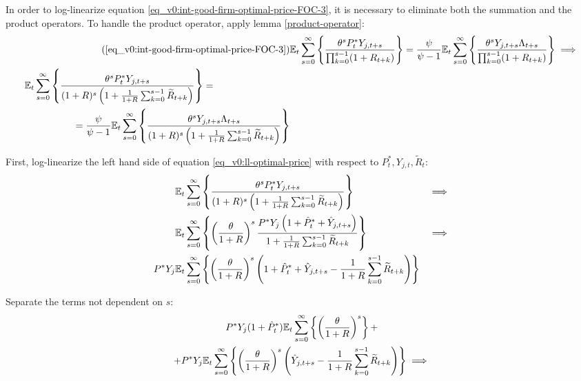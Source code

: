 \documentclass[
thesis.tex
]{subfiles}
\begin{document}
	In order to log-linearize equation \ref{eq_v0:int-good-firm-optimal-price-FOC-3}, it is necessary to eliminate both the summation and the product operators. To handle the product operator, apply lemma \ref{product-operator}:
	\begin{align}
		\tag{\ref{eq_v0:int-good-firm-optimal-price-FOC-3}}
		& \E \sum_{s=0}^{\infty} \left\{ \frac{\theta^s P_t^\ast Y_{j,t+s} }{ \prod_{k=0}^{s-1}(1+R_{t+k})} \right\} = \frac{\psi}{\psi-1} \E \sum_{s=0}^{\infty} \left\{ \frac{\theta^s Y_{j,t+s} \Lambda_{t+s}}{\prod_{k=0}^{s-1}(1+R_{t+k})} \right\} \implies
		\\
		\begin{split}
			& \E \sum_{s=0}^{\infty} \left\{ \frac{\theta^s P_t^\ast Y_{j,t+s}}{ (1 + R)^s \left( 1 + \frac{1}{1 + R} \sum_{k=0}^{s-1} \widetilde{R}_{t+k} \right) } \right\} = 
			\\ & \quad \quad \quad \quad \quad = \frac{\psi}{\psi-1} \E \sum_{s=0}^{\infty} \left\{ \frac{\theta^s Y_{j,t+s} \Lambda_{t+s}}{ (1 + R)^s \left( 1 + \frac{1}{1 + R} \sum_{k=0}^{s-1} \widetilde{R}_{t+k} \right) } \right\} \label{eq_v0:ll-optimal-price}
		\end{split}
	\end{align}
	
	First, log-linearize the left hand side of equation \ref{eq_v0:ll-optimal-price} with respect to \( P_t^\ast, Y_{j,t}, \widetilde{R}_t \):
	\begin{alignat}{2}
		& {\mathbb{E}_{t}} \sum_{s=0}^{\infty} \left\{ \frac{\theta^s P_t^\ast Y_{j,t+s}}{ (1 + R)^s \left( 1 + \frac{1}{1 + R} \sum_{k=0}^{s-1} \widetilde{R}_{t+k} \right) } \right\} &\implies \nonumber \\
		& {\mathbb{E}_{t}} \sum_{s=0}^{\infty} \left\{ \left( \frac{\theta}{1 + R} \right)^s  \frac{ P^\ast Y_{j} \left( 1 + \hat{P}_t^\ast + \hat{Y}_{j,t+s} \right) }{ 1 + \frac{1}{1 + R} \sum_{k=0}^{s-1} \widetilde{R}_{t+k} } \right\} &\implies \nonumber \\
		P^\ast Y_{j} &{\mathbb{E}_{t}} \sum_{s=0}^{\infty} \left\{ \left( \frac{\theta}{1 + R} \right)^s \left( 1 + \hat{P}_t^\ast + \hat{Y}_{j,t+s} - \frac{1}{1 + R} \sum_{k=0}^{s-1} \widetilde{R}_{t+k} \right) \right\} & \nonumber
	\end{alignat}
	
	Separate the terms not dependent on $s$:
	\begin{multline}
		P^\ast Y_{j} ( 1 + \hat{P}_t^\ast ) {\mathbb{E}_{t}} \sum_{s=0}^{\infty} \left\{ \left( \frac{\theta}{1 + R} \right)^s \right\} + \\
		+ P^\ast Y_{j} {\mathbb{E}_{t}} \sum_{s=0}^{\infty} \left\{ \left( \frac{\theta}{1 + R} \right)^s \left( \hat{Y}_{j,t+s} - \frac{1}{1 + R} \sum_{k=0}^{s-1} \widetilde{R}_{t+k} \right) \right\} \implies \nonumber
	\end{multline}
	
\end{document}
